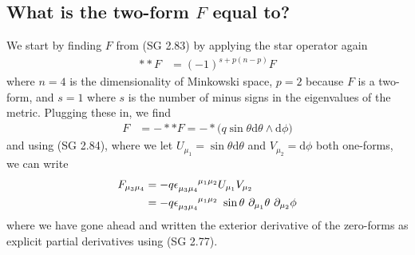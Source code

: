 \subsection{What is the two-form $F$ equal to?}

We start by finding $F$ from (SG 2.83) by applying the star operator again
%
\begin{align}
\ast \ast F &= (-1)^{s + p\left(n-p\right)} F
\end{align} 
%
where $n = 4$ is the dimensionality of Minkowski space, $p=2$ because $F$ is a two-form, and $s=1$ where $s$ is the number of minus signs in the eigenvalues of the metric. Plugging these in, we find  
%
\begin{align}
F &= - \ast \ast F = - \ast \big( q \sin{\theta}  \textrm{d} \theta  \wedge  \textrm{d} \phi \big)
\end{align} 
%
and using (SG 2.84), where we let $U_{\mu_1} = \sin{\theta}  \textrm{d} \theta$ and $V_{\mu_2} =  \textrm{d} \phi$ both one-forms, we can write 
%
\begin{align}
F_{\mu_3 \mu_4} &= - q \epsilon\indices{_{\mu_3 \mu_4}^{\mu_1 \mu_2}} U_{\mu_1} V_{\mu_2} \\
&= - q \epsilon\indices{_{\mu_3 \mu_4}^{\mu_1 \mu_2}} \ \sin{\theta} \ \partial_{\mu_1} \theta \ \partial_{\mu_2} \phi
\end{align} 
%
where we have gone ahead and written the exterior derivative of the zero-forms as explicit partial derivatives using (SG 2.77).

